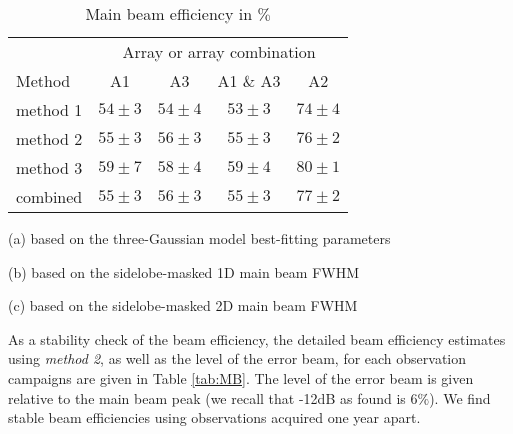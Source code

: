 \begin{table}[!h]
  \caption[]{Main beam efficiency in $\%$}
  \begin{center}
  \begin{threeparttable}
    \renewcommand{\TPTminimum}{0.6\textwidth}
    {\centering
    \begin{tabular}{l|c|c|c|c}
      \hline\hline
      
      &    \multicolumn{4}{|c}{Array or array combination} \\
      \cline{2-5}
      Method & A1 &  A3 & A1 $\&$ A3 &  A2  \\
      \hline
      method 1\tnote{a} &  $54 \pm 3$  & $54 \pm 4$  &  $53 \pm 3$  &  $74 \pm 4$  \\
      method 2\tnote{b} &  $55 \pm 3$  & $56 \pm 3$  &  $55 \pm 3$  &  $76 \pm 2$  \\
        method 3\tnote{c} &  $59 \pm 7$  & $58 \pm 4$  &  $59 \pm 4$  &  $80 \pm 1$  \\
        combined          &  $55 \pm 3$  & $56 \pm 3$  &  $55 \pm 3$  &  $77 \pm 2$  \\
        \hline\hline
    \end{tabular}
    }
    \begin{tablenotes}
      \small
    \item[(a)] based on the three-Gaussian model best-fitting parameters
    \item[(b)] based on the sidelobe-masked 1D main beam FWHM 
    \item[(c)] based on the sidelobe-masked 2D main beam FWHM 
    \end{tablenotes}
  \end{threeparttable}
  \end{center}
  \label{tab:beam_efficiency}
\end{table}


As a stability check of the beam efficiency, the detailed beam
efficiency estimates using \emph{method 2}, as well as the level of
the error beam, for each observation campaigns are given in Table
\ref{tab:MB}. The level of the error beam is given relative to the
main beam peak (we recall that -12dB as found is $6\%$). We find
stable beam efficiencies using observations acquired one year apart.



